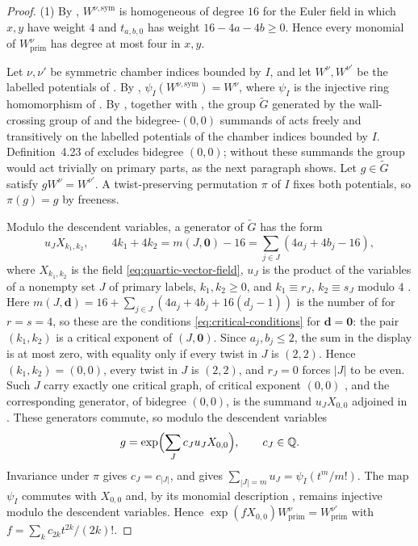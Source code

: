 \begin{proof}
(1) By \cite[(0.6)]{grossetal2022open}, $W^{\nu,\mathrm{sym}}$ is homogeneous
of degree $16$ for the Euler field in which $x,y$ have weight $4$ and
$t_{a,b,0}$ has weight $16-4a-4b\geq0$.  Hence every monomial of
$W^\nu_{\mathrm{prim}}$ has degree at most four in $x,y$.

Let $\nu,\nu'$ be symmetric chamber indices bounded by $I$, and let
$W^\nu,W^{\nu'}$ be the labelled potentials of
\cite[Def.~4.6]{grossetal2022open}.  By \cite[Cor.~4.15]{grossetal2022open},
$\psi_I(W^{\nu,\mathrm{sym}})=W^\nu$, where $\psi_I$ is the injective ring
homomorphism of \cite[Lem.~4.14]{grossetal2022open}.  By
\cite[Lem.~2.5]{wuebben2026boundary}, together with
\cite[Cor.~5.14]{grossetal2022open}, the group $\widetilde G$ generated by the
wall-crossing group of \cite[Def.~4.23]{grossetal2022open} and the
bidegree-$(0,0)$ summands of \cite[Rem.~2.3]{wuebben2026boundary} acts freely
and transitively on the labelled potentials of the chamber indices bounded by
$I$.  Definition~4.23 of \cite{grossetal2022open} excludes bidegree $(0,0)$;
without these summands the group would act trivially on primary parts, as
the next paragraph shows.  Let $g\in\widetilde G$ satisfy $gW^\nu=W^{\nu'}$.
A twist-preserving permutation $\pi$ of $I$ fixes both potentials, so
$\pi(g)=g$ by freeness.

Modulo the descendent variables, a generator of $\widetilde G$ has the form
\[
 u_JX_{k_1,k_2},
 \qquad
 4k_1+4k_2=m(J,\mathbf 0)-16=\sum_{j\in J}(4a_j+4b_j-16),
\]
where $X_{k_1,k_2}$ is the field \eqref{eq:quartic-vector-field}, $u_J$ is
the product of the variables of a nonempty set $J$ of primary labels,
$k_1,k_2\geq0$, and $k_1\equiv r_J$, $k_2\equiv s_J$ modulo $4$
\cite[Def.~4.23 and Notation~2.30]{grossetal2022open}.  Here
$m(J,\mathbf d)=16+\sum_{j\in J}(4a_j+4b_j+16(d_j-1))$ is the number of
\cite[Notation~2.30]{grossetal2022open} for $r=s=4$, so these are the
conditions \eqref{eq:critical-conditions} for $\mathbf d=\mathbf 0$: the pair
$(k_1,k_2)$ is a critical exponent of $(J,\mathbf 0)$.  Since $a_j,b_j\leq2$,
the sum in the display is at most zero, with equality only if every twist in $J$ is
$(2,2)$.  Hence $(k_1,k_2)=(0,0)$, every twist in $J$ is $(2,2)$, and
$r_J=0$ forces $|J|$ to be even.  Such $J$ carry exactly one critical graph,
of critical exponent $(0,0)$ \cite[(2.31)]{grossetal2022open}, and the
corresponding generator, of bidegree $(0,0)$, is the summand $u_JX_{0,0}$
adjoined in \cite[Rem.~2.3]{wuebben2026boundary}.  These generators commute,
so modulo the descendent variables
\[
 g=\exp\Bigl(\sum_Jc_Ju_JX_{0,0}\Bigr),\qquad c_J\in\mathbb Q.
\]
Invariance under $\pi$ gives $c_J=c_{|J|}$, and
\cite[(4.12)]{grossetal2022open} gives $\sum_{|J|=m}u_J=\psi_I(t^m/m!)$.  The
map $\psi_I$ commutes with $X_{0,0}$ and, by its monomial description
\cite[(4.12)]{grossetal2022open}, remains injective modulo the descendent
variables.  Hence
$\exp(fX_{0,0})W^\nu_{\mathrm{prim}}=W^{\nu'}_{\mathrm{prim}}$ with
$f=\sum_kc_{2k}t^{2k}/(2k)!$.


\end{proof}
